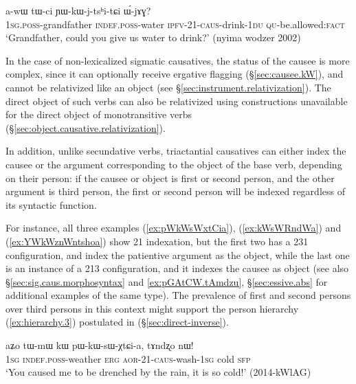 \begin{exe}
	\ex \label{ex:YWkWjtshitCi}
	\gll a-wɯ tɯ-ci ɲɯ-kɯ-j-tsʰi-tɕi ɯ́-jɤɣ? \\
	\textsc{1sg}.\textsc{poss}-grandfather \textsc{indef}.\textsc{poss}-water \textsc{ipfv}-2\fl{}1-\textsc{caus}-drink-\textsc{1du} \textsc{qu}-be.allowed:\textsc{fact} \\
	\glt `Grandfather, could you give us water to drink?' (nyima wodzer 2002)
\end{exe}

In the case of non-lexicalized sigmatic causatives, the status of the causee is more complex, since it can optionally receive ergative flagging (§\ref{sec:causee.kW}), and cannot be relativized like an object (see §\ref{sec:instrument.relativization}). The direct object of such verbs can also be relativized using constructions unavailable for the direct object of monotransitive verbs (§\ref{sec:object.causative.relativization}).

In addition, unlike secundative verbs, triactantial causatives can either index the causee or the argument corresponding to the object of the base verb, depending on their person: if the causee or object is first or second person, and the other argument is third person, the first or second person will be indexed regardless of its syntactic function. 

For instance, all three examples (\ref{ex:pWkWsWxtCia}), (\ref{ex:kWsWRndWa}) and (\ref{ex:YWkWznWntshoa}) show 2\fl{}1 indexation, but the first two has a 2\fl{}3\fl{}1 configuration, and index the patientive argument as the object, while the last one is an instance of a 2\fl{}1\fl{}3 configuration, and it indexes the causee as object (see also §\ref{sec:sig.caus.morphosyntax} and \ref{ex:pGAtCW.tAmdzu}, §\ref{sec:essive.abs} for additional examples of the same type). The prevalence of first and second persons over third persons in this context might support the person hierarchy (\ref{ex:hierarchy.3}) postulated in (§\ref{sec:direct-inverse}).

\begin{exe}
	\ex \label{ex:pWkWsWxtCia}
	\gll  aʑo tɯ-mɯ kɯ pɯ-kɯ-sɯ-χtɕi-a, tɤndʐo nɯ! \\
	\textsc{1sg} \textsc{indef}.\textsc{poss}-weather \textsc{erg} \textsc{aor}-2\fl{}1-\textsc{caus}-wash-\textsc{1sg} cold \textsc{sfp} \\
	\glt `You caused me to be drenched by the rain, it is so cold!' (2014-kWlAG)
\end{exe}

